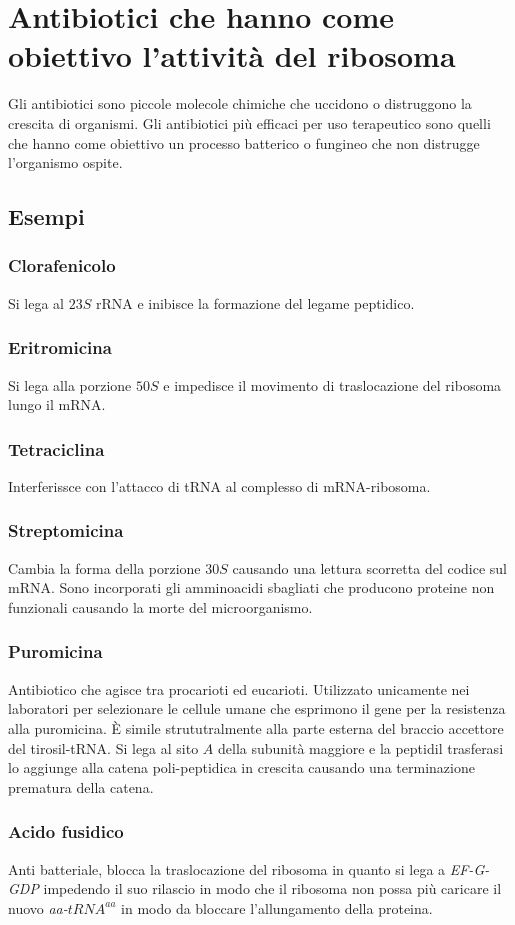 \section{Antibiotici che hanno come obiettivo l'attivit\`a del ribosoma}
Gli antibiotici sono piccole molecole chimiche che uccidono o distruggono la crescita di organismi. Gli antibiotici pi\`u efficaci per uso terapeutico sono quelli che hanno
come obiettivo un processo batterico o fungineo che non distrugge l'organismo ospite. 

\subsection{Esempi}
\subsubsection{Clorafenicolo}
Si lega al $23S$ rRNA e inibisce la formazione del legame peptidico. 
\subsubsection{Eritromicina}
Si lega alla porzione $50S$ e impedisce il movimento di traslocazione del ribosoma lungo il mRNA.
\subsubsection{Tetraciclina}
Interferissce con l'attacco di tRNA al complesso di mRNA-ribosoma.
\subsubsection{Streptomicina}
Cambia la forma della porzione $30S$ causando una lettura scorretta del codice sul mRNA. Sono incorporati gli amminoacidi sbagliati che producono proteine non funzionali causando la morte
del microorganismo.
\subsubsection{Puromicina}
Antibiotico che agisce tra procarioti ed eucarioti. Utilizzato unicamente nei laboratori per selezionare le cellule umane che esprimono il gene per la resistenza alla puromicina. \`E
simile strututralmente alla parte esterna del braccio accettore del tirosil-tRNA. Si lega al sito $A$ della subunit\`a maggiore e la peptidil trasferasi lo aggiunge alla catena 
poli-peptidica in crescita causando una terminazione prematura della catena. 
\subsubsection{Acido fusidico}
Anti batteriale, blocca la traslocazione del ribosoma in quanto si lega a \emph{EF-G-GDP} impedendo il suo rilascio in modo che il ribosoma non possa pi\`u caricare il nuovo
\emph{aa-$tRNA^{aa}$} in modo da bloccare l'allungamento della proteina. 
